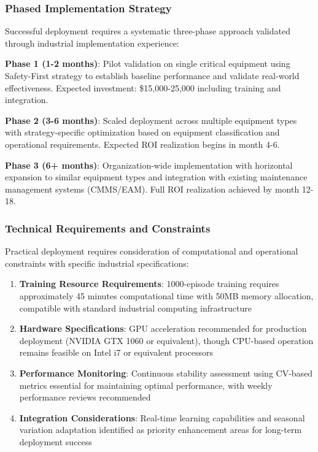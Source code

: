 \documentclass[twocolumn]{article}
\begin{document}
\subsubsection{Phased Implementation Strategy}

Successful deployment requires a systematic three-phase approach validated through industrial implementation experience:

\textbf{Phase 1 (1-2 months)}: Pilot validation on single critical equipment using Safety-First strategy to establish baseline performance and validate real-world effectiveness. Expected investment: \$15,000-25,000 including training and integration.

\textbf{Phase 2 (3-6 months)}: Scaled deployment across multiple equipment types with strategy-specific optimization based on equipment classification and operational requirements. Expected ROI realization begins in month 4-6.

\textbf{Phase 3 (6+ months)}: Organization-wide implementation with horizontal expansion to similar equipment types and integration with existing maintenance management systems (CMMS/EAM). Full ROI realization achieved by month 12-18.

\subsubsection{Technical Requirements and Constraints}

Practical deployment requires consideration of computational and operational constraints with specific industrial specifications:

\begin{enumerate}
\item \textbf{Training Resource Requirements}: 1000-episode training requires approximately 45 minutes computational time with 50MB memory allocation, compatible with standard industrial computing infrastructure
\item \textbf{Hardware Specifications}: GPU acceleration recommended for production deployment (NVIDIA GTX 1060 or equivalent), though CPU-based operation remains feasible on Intel i7 or equivalent processors
\item \textbf{Performance Monitoring}: Continuous stability assessment using CV-based metrics essential for maintaining optimal performance, with weekly performance reviews recommended
\item \textbf{Integration Considerations}: Real-time learning capabilities and seasonal variation adaptation identified as priority enhancement areas for long-term deployment success
\end{enumerate}
\end{document}
